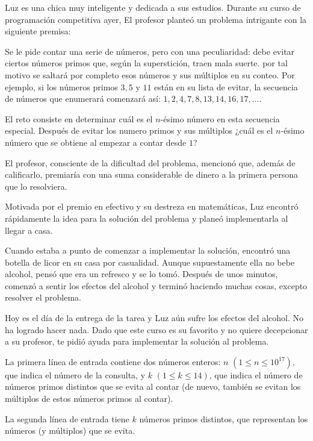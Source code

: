 
Luz es una chica muy inteligente y dedicada a sus estudios. Durante su curso de programación competitiva ayer, El profesor planteó un problema intrigante con la siguiente premisa:

Se le pide contar una serie de números, pero con una peculiaridad: debe evitar ciertos números primos que, según la superstición, traen mala suerte. por tal motivo se saltará por completo esos números y sus múltiplos en su conteo. Por ejemplo, si los números primos $3, 5$ y $11$ están en su lista de evitar, la secuencia de números que enumerará comenzará así: $1, 2, 4, 7, 8, 13, 14, 16, 17,. . .$.

El reto consiste en determinar cuál es el $n$-ésimo número en esta secuencia especial. Después de evitar los numero primos y sus múltiplos ¿cuál es el $n$-ésimo número que se obtiene al empezar a contar desde $1$?


El profesor, consciente de la dificultad del problema, mencionó que, además de calificarlo, premiaría con una suma considerable de dinero a la primera persona que lo resolviera.


Motivada por el premio en efectivo y su destreza en matemáticas, Luz encontró rápidamente la idea para la solución del problema y planeó implementarla al llegar a casa.


Cuando estaba a punto de comenzar a implementar la solución, encontró una botella de licor en su casa por casualidad. Aunque supuestamente ella no  bebe alcohol, pensó que era un refresco y se lo tomó. Después de unos minutos, comenzó a sentir los efectos del alcohol y terminó haciendo muchas cosas, excepto resolver el problema.


Hoy es el día de la entrega de la tarea y Luz aún sufre los efectos del alcohol. No ha logrado hacer nada. Dado que este curso es su favorito y no quiere decepcionar a su profesor, te pidió ayuda para implementar la solución al problema.


La primera línea de entrada contiene dos números enteros: $n$  $(1 \leq n \leq 10^{17})$, que indica el número de la consulta, y $k$  $(1 \leq k \leq 14)$, que indica el número de números primos distintos que  se evita al contar (de nuevo, también se evitan los múltiplos de estos números primos al contar).

La segunda línea de entrada tiene $k$ números primos distintos, que representan los números (y múltiplos) que se evita.

